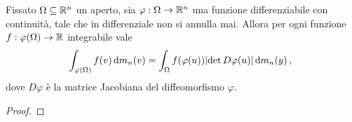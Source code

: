 \begin{theorem}\label{thm:CambioVariabile}
	Fissato $\Omega\subseteq\mathbb R^n$ un aperto, sia $\varphi:\Omega\to\mathbb R^n$ una funzione differenziabile con continuità, tale che in differenziale non si annulla mai.
	Allora per ogni funzione $f:\varphi(\Omega)\to\mathbb R$ integrabile vale
	\begin{equation*}
		\int_{\varphi(\Omega)} f(v)\,\mathrm d m_n(v) = \int_{\Omega} f(\varphi(u))\lvert \det D\varphi(u) \rvert \,\mathrm d m_n(y) \, \text{, }
	\end{equation*}
	dove $D\varphi$ è la matrice Jacobiana del diffeomorfismo $\varphi$.
\end{theorem}
\begin{proof}
\end{proof}


